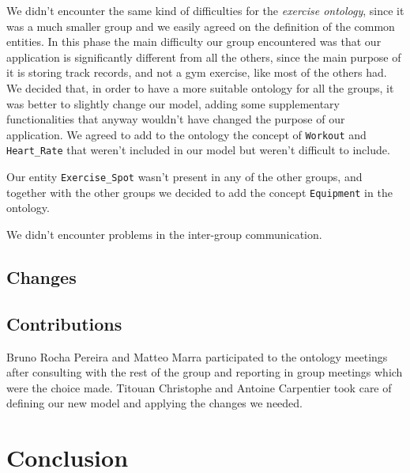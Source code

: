 \documentclass[a4paper]{article}
\begin{document}
We didn't encounter the same kind of difficulties for the \textit{exercise ontology}, since it was a much smaller group and we easily agreed on the definition of the common entities.
In this phase the main difficulty our group encountered was that our application is significantly different from all the others, since the main purpose of it is storing track records, and not a gym exercise, like most of the others had.
We decided that, in order to have a more suitable ontology for all the groups, it was better to slightly change our model, adding some supplementary functionalities that anyway wouldn't have changed the purpose of our application. 
We agreed to add to the ontology the concept of \texttt{Workout} and \texttt{Heart\_Rate} that weren't included in our model but weren't difficult to include. 

Our entity \texttt{Exercise\_Spot} wasn't present in any of the other groups, and together with the other groups we decided to add the concept \texttt{Equipment} in the ontology.

We didn't encounter problems in the inter-group communication. 

\subsection{Changes}
\subsection{Contributions}
Bruno Rocha Pereira and Matteo Marra participated to the ontology meetings after consulting with the rest of the group and reporting in group meetings which were the choice made. 
Titouan Christophe and Antoine Carpentier took care of defining our new model and applying the changes we needed. 
\section{Conclusion}
\end{document}
